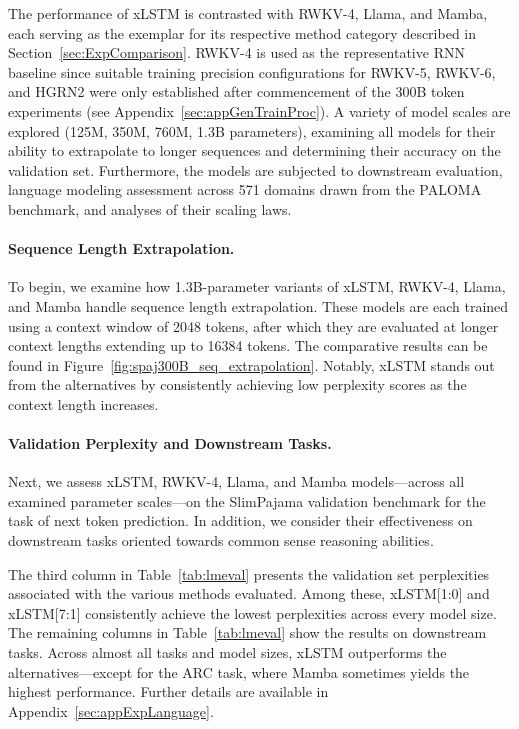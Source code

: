 The performance of xLSTM is contrasted with RWKV-4, Llama, and Mamba, each serving as the exemplar for its respective method category described in Section~\ref{sec:ExpComparison}.
RWKV-4 is used as the representative RNN baseline since suitable training precision configurations for RWKV-5, RWKV-6, and HGRN2 were only established after commencement of the 300B token experiments (see Appendix~\ref{sec:appGenTrainProc}).
A variety of model scales are explored (125M, 350M, 760M, 1.3B parameters), examining all models for their ability to extrapolate to longer sequences and determining their accuracy on the validation set. Furthermore, the models are subjected to downstream evaluation, language modeling assessment across 571 domains drawn from the PALOMA benchmark, and analyses of their scaling laws.

\paragraph{Sequence Length Extrapolation.}
\label{sec:spaj300B_ctx_extrapolation}
To begin, we examine how 1.3B-parameter variants of xLSTM, RWKV-4, Llama, and Mamba handle sequence length extrapolation. These models are each trained using a context window of 2048 tokens, after which they are evaluated at longer context lengths extending up to 16384 tokens. The comparative results can be found in Figure~\ref{fig:spaj300B_seq_extrapolation}. Notably, xLSTM stands out from the alternatives by consistently achieving low perplexity scores as the context length increases.

\paragraph{Validation Perplexity and Downstream Tasks.}
\label{sec:spaj_downstream_eval}
Next, we assess xLSTM, RWKV-4, Llama, and Mamba models—across all examined parameter scales—on the SlimPajama validation benchmark for the task of next token prediction. In addition, we consider their effectiveness on downstream tasks oriented towards common sense reasoning abilities.

The third column in Table~\ref{tab:lmeval} presents the validation set perplexities associated with the various methods evaluated. Among these, xLSTM[1:0] and xLSTM[7:1] consistently achieve the lowest perplexities across every model size. The remaining columns in Table~\ref{tab:lmeval} show the results on downstream tasks. Across almost all tasks and model sizes, xLSTM outperforms the alternatives—except for the ARC task, where Mamba sometimes yields the highest performance. Further details are available in Appendix~\ref{sec:appExpLanguage}.

